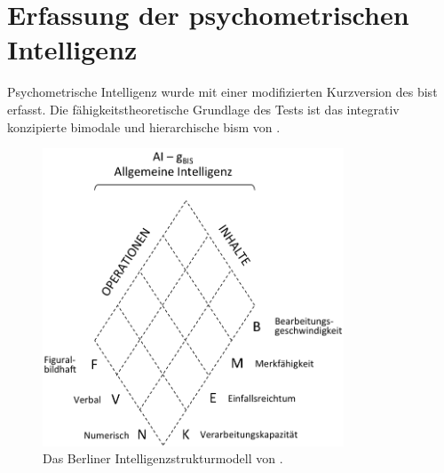\documentclass[11pt, twoside, a4paper]{book}		%
\begin{document}
\section{Erfassung der psychometrischen Intelligenz \label{sec:Erfassung_der_psychometrischen_Intelligenz}}



Psychometrische Intelligenz wurde mit einer modifizierten Kurzversion des \acrlong{bist} \citep[\gls{bist};][]{Jaeger1997} erfasst. Die fähigkeitstheoretische Grundlage des Tests ist das integrativ konzipierte bimodale und hierarchische \gls{bism} von \citet[][siehe \autoref{fig:bis_model}]{Jaeger1984}. 

\begin{figure}[htb]
	\centering
	\includegraphics[width=0.8\textwidth]{png/BIS}
	\caption[Das Berliner Intelligenzstrukturmodell]{Das Berliner Intelligenzstrukturmodell von \citet{Jaeger1984}.}
	\label{fig:bis_model}
\end{figure} 
\end{document}
